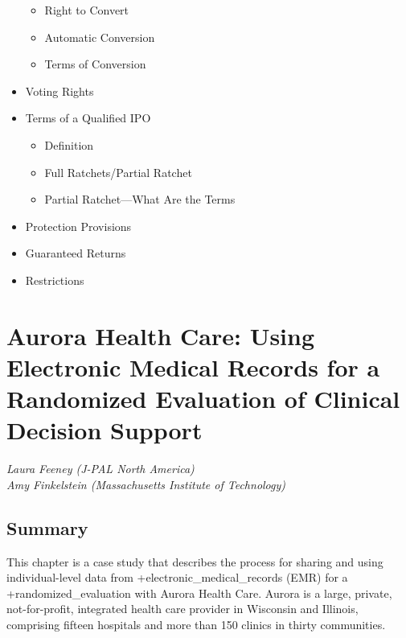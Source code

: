 \documentclass[
]{WileySix}
\providecommand{\tightlist}{%
  \setlength{\itemsep}{0pt}\setlength{\parskip}{0pt}}
\begin{document}
\begin{itemize}
  \begin{itemize}
  \tightlist
  \item
    Right to Convert\\
  \item
    Automatic Conversion\\
  \item
    Terms of Conversion\\
  \end{itemize}
\item
  Voting Rights\\
\item
  Terms of a Qualified IPO

  \begin{itemize}
  \tightlist
  \item
    Definition\\
  \item
    Full Ratchets/Partial Ratchet\\
  \item
    Partial Ratchet---What Are the Terms\\
  \end{itemize}
\item
  Protection Provisions\\
\item
  Guaranteed Returns\\
\item
  Restrictions
\end{itemize}

\hypertarget{ahc}{%
\section{Aurora Health Care: Using Electronic Medical Records for a Randomized Evaluation of Clinical Decision Support}\label{ahc}}

\emph{Laura Feeney (J-PAL North America)}\\
\emph{Amy Finkelstein (Massachusetts Institute of Technology)}

\hypertarget{summary-5}{%
\subsection{Summary}\label{summary-5}}

This chapter is a case study that describes the process for sharing and using individual-level data from +electronic\_medical\_records\textbar{} (EMR) for a +randomized\_evaluation\textbar{} with Aurora Health Care. Aurora is a large, private, not-for-profit, integrated health care provider in Wisconsin and Illinois, comprising fifteen hospitals and more than 150 clinics in thirty communities.
\end{document}
